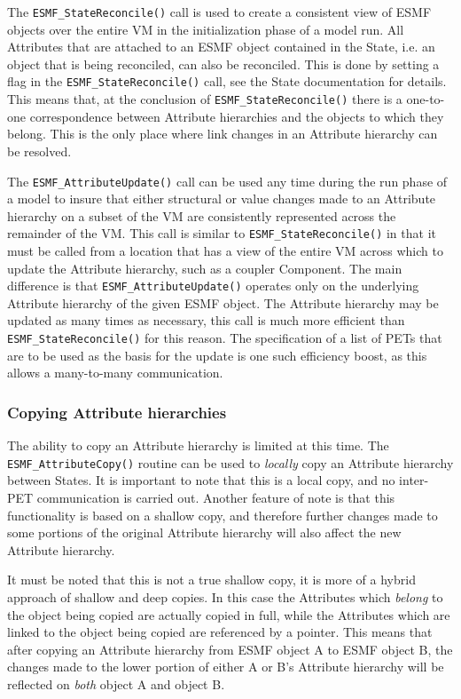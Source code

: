 The {\tt ESMF\_StateReconcile()} call is used to create a consistent view of ESMF objects over the entire VM in the initialization phase of a model run.  All Attributes that are attached to an ESMF object contained in the State, i.e. an object that is being reconciled, can also be reconciled.  This is done by setting a flag in the {\tt ESMF\_StateReconcile()} call, see the State documentation for details.  This means that, at the conclusion of {\tt ESMF\_StateReconcile()} there is a one-to-one correspondence between Attribute hierarchies and the objects to which they belong.  This is the only place where link changes in an Attribute hierarchy can be resolved.

The {\tt ESMF\_AttributeUpdate()} call can be used any time during the run phase of a model to insure that either structural or value changes made to an Attribute hierarchy on a subset of the VM are consistently represented across the remainder of the VM.  This call is similar to {\tt ESMF\_StateReconcile()} in that it must be called from a location that has a view of the entire VM across which to update the Attribute hierarchy, such as a coupler Component.  The main difference is that {\tt ESMF\_AttributeUpdate()} operates only on the underlying Attribute hierarchy of the given ESMF object.  The Attribute hierarchy may be updated as many times as necessary, this call is much more efficient than {\tt ESMF\_StateReconcile()} for this reason.  The specification of a list of PETs that are to be used as the basis for the update is one such efficiency boost, as this allows a many-to-many communication.

\subsubsection{Copying Attribute hierarchies}

The ability to copy an Attribute hierarchy is limited at this time.  The {\tt ESMF\_AttributeCopy()} routine can be used to {\it locally} copy an Attribute hierarchy between States.  It is important to note that this is a local copy, and no inter-PET communication is carried out.  Another feature of note is that this functionality is based on a shallow copy, and therefore further changes made to some portions of the original Attribute hierarchy will also affect the new Attribute hierarchy.

It must be noted that this is not a true shallow copy, it is more of a hybrid approach of shallow and deep copies.  In this case the Attributes which {\it belong} to the object being copied are actually copied in full, while the Attributes which are linked to the object being copied are referenced by a pointer.  This means that after copying an Attribute hierarchy from ESMF object A to ESMF object B, the changes made to the lower portion of either A or B's Attribute hierarchy will be reflected on {\it both} object A and object B.





